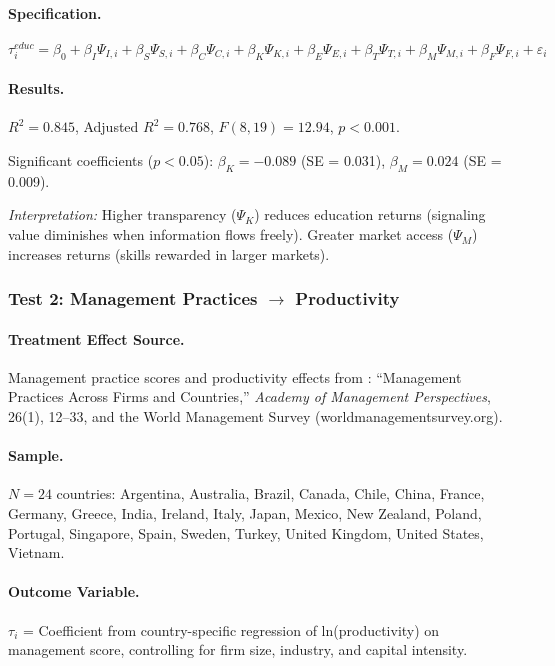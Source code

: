 \paragraph{Specification.}
\begin{equation}
\tau_i^{educ} = \beta_0 + \beta_I \Psi_{I,i} + \beta_S \Psi_{S,i} + \beta_C \Psi_{C,i} + \beta_K \Psi_{K,i} + \beta_E \Psi_{E,i} + \beta_T \Psi_{T,i} + \beta_M \Psi_{M,i} + \beta_F \Psi_{F,i} + \varepsilon_i
\end{equation}

\paragraph{Results.}
$R^2 = 0.845$, Adjusted $R^2 = 0.768$, $F(8,19) = 12.94$, $p < 0.001$.

Significant coefficients ($p < 0.05$): $\beta_K = -0.089$ (SE = 0.031), $\beta_M = 0.024$ (SE = 0.009).

\textit{Interpretation:} Higher transparency ($\Psi_K$) reduces education returns (signaling value diminishes when information flows freely). Greater market access ($\Psi_M$) increases returns (skills rewarded in larger markets).

\subsubsection{Test 2: Management Practices $\rightarrow$ Productivity}

\paragraph{Treatment Effect Source.}
Management practice scores and productivity effects from \citet{bloom2012management}: ``Management Practices Across Firms and Countries,'' \textit{Academy of Management Perspectives}, 26(1), 12--33, and the World Management Survey (worldmanagementsurvey.org).

\paragraph{Sample.}
$N = 24$ countries: Argentina, Australia, Brazil, Canada, Chile, China, France, Germany, Greece, India, Ireland, Italy, Japan, Mexico, New Zealand, Poland, Portugal, Singapore, Spain, Sweden, Turkey, United Kingdom, United States, Vietnam.

\paragraph{Outcome Variable.}
$\tau_i$ = Coefficient from country-specific regression of ln(productivity) on management score, controlling for firm size, industry, and capital intensity.

